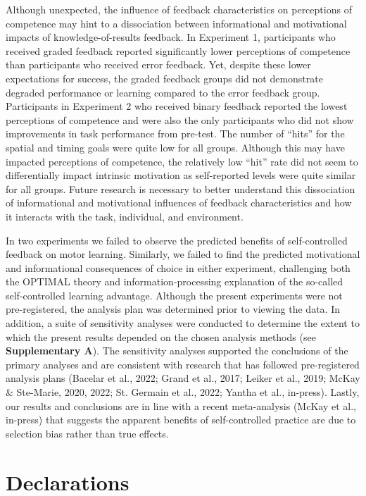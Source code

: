 \documentclass[
  doc, donotrepeattitle,floatsintext]{apa7}
\begin{document}
Although unexpected, the influence of feedback characteristics on perceptions of competence may hint to a dissociation between informational and motivational impacts of knowledge-of-results feedback. In Experiment 1, participants who received graded feedback reported significantly lower perceptions of competence than participants who received error feedback. Yet, despite these lower expectations for success, the graded feedback groups did not demonstrate degraded performance or learning compared to the error feedback group. Participants in Experiment 2 who received binary feedback reported the lowest perceptions of competence and were also the only participants who did not show improvements in task performance from pre-test. The number of ``hits'' for the spatial and timing goals were quite low for all groups. Although this may have impacted perceptions of competence, the relatively low ``hit'' rate did not seem to differentially impact intrinsic motivation as self-reported levels were quite similar for all groups. Future research is necessary to better understand this dissociation of informational and motivational influences of feedback characteristics and how it interacts with the task, individual, and environment.

In two experiments we failed to observe the predicted benefits of self-controlled feedback on motor learning. Similarly, we failed to find the predicted motivational and informational consequences of choice in either experiment, challenging both the OPTIMAL theory and information-processing explanation of the so-called self-controlled learning advantage. Although the present experiments were not pre-registered, the analysis plan was determined prior to viewing the data. In addition, a suite of sensitivity analyses were conducted to determine the extent to which the present results depended on the chosen analysis methods (see \textbf{Supplementary A}). The sensitivity analyses supported the conclusions of the primary analyses and are consistent with research that has followed pre-registered analysis plans (Bacelar et al., 2022; Grand et al., 2017; Leiker et al., 2019; McKay \& Ste-Marie, 2020, 2022; St. Germain et al., 2022; Yantha et al., in-press). Lastly, our results and conclusions are in line with a recent meta-analysis (McKay et al., in-press) that suggests the apparent benefits of self-controlled practice are due to selection bias rather than true effects.

\clearpage

\hypertarget{declarations}{%
\section{Declarations}\label{declarations}}
\end{document}
